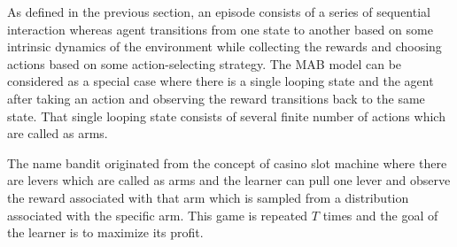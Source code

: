 As defined in the previous section, an episode consists of a series of sequential interaction whereas agent transitions from one state to another based on some intrinsic dynamics of the environment while collecting the rewards and choosing actions based on some action-selecting strategy. The MAB model can be considered as a special case where there is a single looping state and the agent after taking an action and observing the reward transitions back to the same state. That single looping state consists of several finite number of actions which are called as arms.

    The name bandit originated from the concept of casino slot machine where there are levers which are called as arms and the learner can pull one lever and observe the reward associated with that arm which is sampled from a distribution associated with the specific arm. This game is repeated $T$ times and the goal of the learner is to maximize its profit. 

